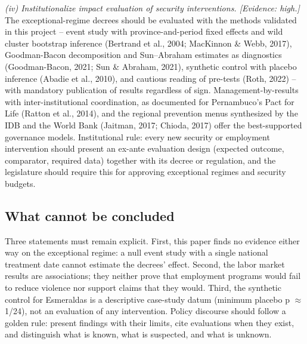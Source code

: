 \textit{(iv) Institutionalize impact evaluation of security interventions. [Evidence: high.]} The exceptional-regime decrees should be evaluated with the methods validated in this project -- event study with province-and-period fixed effects and wild cluster bootstrap inference (Bertrand et al., 2004; MacKinnon \& Webb, 2017), Goodman-Bacon decomposition and Sun--Abraham estimates as diagnostics (Goodman-Bacon, 2021; Sun \& Abraham, 2021), synthetic control with placebo inference (Abadie et al., 2010), and cautious reading of pre-tests (Roth, 2022) -- with mandatory publication of results regardless of sign. Management-by-results with inter-institutional coordination, as documented for Pernambuco's Pact for Life (Ratton et al., 2014), and the regional prevention menus synthesized by the IDB and the World Bank (Jaitman, 2017; Chioda, 2017) offer the best-supported governance models. Institutional rule: every new security or employment intervention should present an ex-ante evaluation design (expected outcome, comparator, required data) together with its decree or regulation, and the legislature should require this for approving exceptional regimes and security budgets.



\subsection{What cannot be concluded}



Three statements must remain explicit. First, this paper finds no evidence either way on the exceptional regime: a null event study with a single national treatment date cannot estimate the decrees' effect. Second, the labor market results are associations; they neither prove that employment programs would fail to reduce violence nor support claims that they would. Third, the synthetic control for Esmeraldas is a descriptive case-study datum (minimum placebo p $\approx$ 1/24), not an evaluation of any intervention. Policy discourse should follow a golden rule: present findings with their limits, cite evaluations when they exist, and distinguish what is known, what is suspected, and what is unknown.